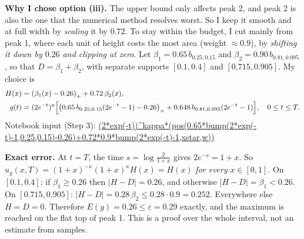 \documentclass[10pt,a4paper]{article}
\newcommand{\pos}[1]{\left(#1\right)_+}
\begin{document}
\textbf{Why I chose option (iii).} The upper bound only affects peak 2, and peak 2 is also the one that the numerical method resolves worst. So I keep it smooth and at full width by \emph{scaling} it by $0.72$. To stay within the budget, I cut mainly from peak 1, where each unit of height costs the most area (weight $\approx0.9$), by \emph{shifting it down by $0.26$ and clipping at zero}. Let $\beta_1=0.65\,b_{0.25,0.15}$ and $\beta_2=0.90\,b_{0.81,0.095}$, so that $D=\beta_1+\beta_2$, with separate supports $[0.1,0.4]$ and $[0.715,0.905]$. My choice is
\begin{equation}
\begin{aligned}H(x)&=\pos{\beta_1(x)-0.26}+0.72\,\beta_2(x),\\
g(t)&=(2e^{-t})^{\kappa}\Bigl[\pos{0.65\,b_{0.25,0.15}(2e^{-t}-1)-0.26}+0.648\,b_{0.81,0.095}(2e^{-t}-1)\Bigr],\quad 0\le t\le T.\end{aligned}
\label{eq:g}
\end{equation}
Notebook input (Step 3): {\small\url{(2*exp(-t))^kappa*(pos(0.65*bump(2*exp(-t)-1,0.25,0.15)-0.26)+0.72*0.9*bump(2*exp(-t)-1,xstar,w))}}

\textbf{Exact error.} At $t=T$, the time $s=\log\frac{2}{1+x}$ gives $2e^{-s}=1+x$. So $u_g(x,T)=(1+x)^{-\kappa}(1+x)^{\kappa}H(x)=H(x)$ \emph{for every} $x\in[0,1]$. On $[0.1,0.4]$: if $\beta_1\ge0.26$ then $|H-D|=0.26$, and otherwise $|H-D|=\beta_1<0.26$. On $[0.715,0.905]$: $|H-D|=0.28\,\beta_2\le0.28\cdot0.9=0.252$. Everywhere else $H=D=0$. Therefore $E(g)=0.26\le\varepsilon=0.29$ exactly, and the maximum is reached on the flat top of peak 1. This is a proof over the whole interval, not an estimate from samples.
\end{document}

